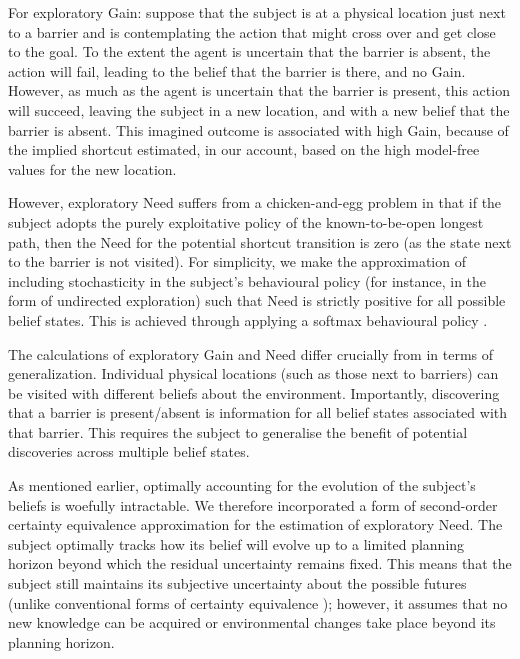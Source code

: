 For exploratory Gain: suppose that the subject is at a physical location just next to a barrier and is contemplating the action that might cross over and get close to the goal. To the extent the agent is uncertain that the barrier is 
absent, the action will fail, leading  to the belief that the barrier is there, and no Gain. However, as much as the agent is uncertain that the barrier is present, this action will succeed, leaving the subject in a new location, and with a new belief that the barrier is absent. This imagined outcome is associated with high Gain, because of the
implied shortcut estimated, in our account, based on the high model-free values for the new location. 

However, exploratory Need suffers from a chicken-and-egg problem in that if the          
subject adopts the purely exploitative policy of the known-to-be-open           
longest path, then the Need for the potential shortcut transition is            
zero (as the state next to the barrier is not visited). For simplicity, we make the approximation of including  stochasticity in the subject's behavioural policy (for instance, in the form of undirected exploration) such that Need is strictly positive for all possible belief states. This is achieved through applying a softmax behavioural policy \parencite{dawCorticalSubstratesExploratory2006}. 

The calculations of exploratory Gain and Need differ crucially from \textcite{mattarPrioritizedMemoryAccess2018} in terms of generalization. Individual physical locations (such as those next to barriers) can be visited with different beliefs about the environment. Importantly, discovering that a barrier is present/absent is information for all belief states associated with that barrier. This requires the subject to generalise the benefit of potential discoveries across multiple belief states.

As mentioned earlier, optimally accounting for the evolution of the subject's beliefs is woefully intractable. We therefore incorporated a form of second-order certainty equivalence approximation \parencite{dayanExplorationBonusesDual1996} for the estimation of exploratory Need. The subject optimally tracks how its belief will evolve up to a limited planning horizon beyond which the residual uncertainty remains fixed. This means that the subject still maintains its subjective uncertainty about the possible futures (unlike  conventional forms of certainty equivalence \parencite{cozzolinoMarkovianDecisionProcesses1965}); however, it assumes that no new knowledge can be acquired or environmental changes take place beyond its planning horizon.

